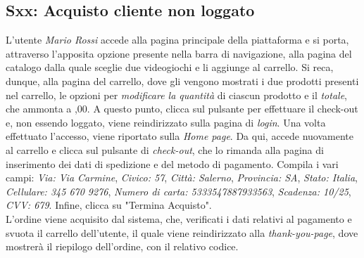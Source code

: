 \documentclass[12pt, a4paper, oneside]{book}
\begin{document}
    \subsection*{Sxx: Acquisto cliente non loggato}
    L'utente \textit{Mario Rossi} accede alla pagina principale della piattaforma e si porta, attraverso l'apposita opzione presente nella barra di navigazione, alla pagina del catalogo dalla quale sceglie due videogiochi e li aggiunge al carrello. Si reca, dunque, alla pagina del carrello, dove gli vengono mostrati i due prodotti presenti nel carrello, le opzioni per \textit{modificare la quantità} di ciascun prodotto e il \textit{totale}, che ammonta a ,00. A questo punto, clicca sul pulsante per effettuare il check-out e, non essendo loggato, viene reindirizzato sulla pagina di \textit{login}. Una volta effettuato l'accesso, viene riportato sulla \textit{Home page}. Da qui, accede nuovamente al carrello e clicca sul pulsante di \textit{check-out}, che lo rimanda alla pagina di inserimento dei dati di spedizione e del metodo di pagamento. Compila i vari campi: \textit{Via: Via Carmine}, \textit{Civico: 57}, \textit{Città: Salerno}, \textit{Provincia: SA}, \textit{Stato: Italia}, \textit{Cellulare: 345 670 9276}, \textit{Numero di carta: 5333547887933563}, \textit{Scadenza: 10/25}, \textit{CVV: 679}. Infine, clicca su "Termina Acquisto".\\
    L'ordine viene acquisito dal sistema, che, verificati i dati relativi al pagamento e svuota il carrello dell'utente, il quale viene reindirizzato alla \textit{thank-you-page}, dove mostrerà il riepilogo dell'ordine, con il relativo codice.
\end{document}
